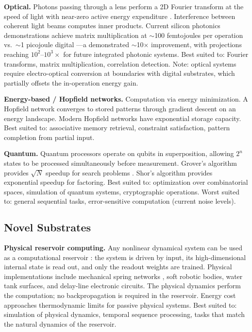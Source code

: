 \documentclass[12pt]{article}
\begin{document}
\textbf{Optical.} Photons passing through a lens perform a 2D Fourier transform at the speed of light with near-zero active energy expenditure \cite{goodman2005}. Interference between coherent light beams computes inner products. Current silicon photonics demonstrations achieve matrix multiplication at $\sim$100 femtojoules per operation vs.\ $\sim$1 picojoule digital \cite{shen2017}---a demonstrated $\sim$10$\times$ improvement, with projections reaching $10^2$--$10^3\times$ for future integrated photonic systems. Best suited to: Fourier transforms, matrix multiplication, correlation detection. Note: optical systems require electro-optical conversion at boundaries with digital substrates, which partially offsets the in-operation energy gain.

\textbf{Energy-based / Hopfield networks.} Computation via energy minimization. A Hopfield network \cite{hopfield1982} converges to stored patterns through gradient descent on an energy landscape. Modern Hopfield networks \cite{ramsauer2020} have exponential storage capacity. Best suited to: associative memory retrieval, constraint satisfaction, pattern completion from partial input.

\textbf{Quantum.} Quantum processors operate on qubits in superposition, allowing $2^n$ states to be processed simultaneously before measurement. Grover's algorithm provides $\sqrt{N}$ speedup for search problems \cite{grover1996}. Shor's algorithm provides exponential speedup for factoring. Best suited to: optimization over combinatorial spaces, simulation of quantum systems, cryptographic operations. Worst suited to: general sequential tasks, error-sensitive computation (current noise levels).

\subsection{Novel Substrates}

\textbf{Physical reservoir computing.} Any nonlinear dynamical system can be used as a computational reservoir \cite{jaeger2004}: the system is driven by input, its high-dimensional internal state is read out, and only the readout weights are trained. Physical implementations include mechanical spring networks \cite{stern2021}, soft robotic bodies, water tank surfaces, and delay-line electronic circuits. The physical dynamics perform the computation; no backpropagation is required in the reservoir. Energy cost approaches thermodynamic limits for passive physical systems. Best suited to: simulation of physical dynamics, temporal sequence processing, tasks that match the natural dynamics of the reservoir.
\end{document}
